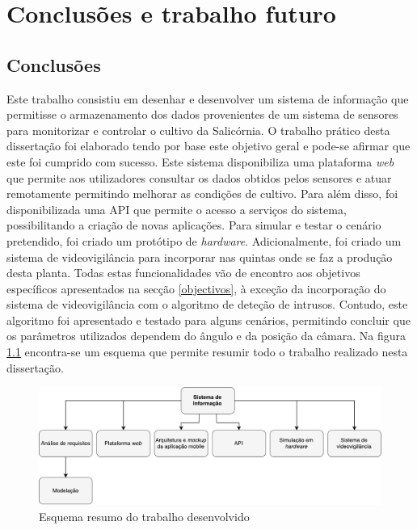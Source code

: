 \chapter{Conclusões e trabalho futuro}


\section{Conclusões}



Este trabalho consistiu em desenhar e desenvolver um sistema de informação que permitisse o armazenamento dos dados provenientes de um sistema de sensores para monitorizar e controlar o cultivo da Salicórnia. O trabalho prático desta dissertação foi elaborado tendo por base este objetivo geral e pode-se afirmar que este foi cumprido com sucesso. Este sistema disponibiliza uma plataforma \textit{web} que permite aos utilizadores consultar os dados obtidos pelos sensores e atuar remotamente permitindo melhorar as condições de cultivo. Para além disso, foi disponibilizada uma \ac{API} que permite o acesso a serviços do sistema, possibilitando a criação de novas aplicações. Para simular e testar o cenário pretendido, foi criado um protótipo de \textit{hardware}. Adicionalmente, foi criado um sistema de videovigilância para incorporar nas quintas onde se faz a produção desta planta. Todas estas funcionalidades vão de encontro aos objetivos específicos apresentados na secção \ref{objectivos}, à exceção da incorporação do sistema de videovigilância com o algoritmo de deteção de intrusos. Contudo, este algoritmo foi apresentado e testado para alguns cenários, permitindo concluir que os parâmetros utilizados dependem do ângulo e da posição da câmara.  Na figura \ref{resumo} encontra-se um esquema que permite resumir todo o trabalho realizado nesta dissertação. 

\begin{figure}[h]
	\centering
	\includegraphics[width=0.68\linewidth]{esquemas/conclusaofinal.pdf}
	\caption{Esquema resumo do trabalho desenvolvido}
	\label{resumo}
\end{figure}



